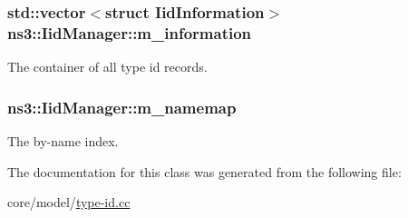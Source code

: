 \subsubsection[{\texorpdfstring{m\+\_\+information}{m_information}}]{\setlength{\rightskip}{0pt plus 5cm}std\+::vector$<$struct {\bf Iid\+Information}$>$ ns3\+::\+Iid\+Manager\+::m\+\_\+information\hspace{0.3cm}{\ttfamily [private]}}\hypertarget{classns3_1_1IidManager_a70a768fafd827135a13cd6e613e9c78e}{}\label{classns3_1_1IidManager_a70a768fafd827135a13cd6e613e9c78e}
The container of all type id records. 
\subsubsection[{\texorpdfstring{m\+\_\+namemap}{m_namemap}}]{ ns3\+::\+Iid\+Manager\+::m\+\_\+namemap\hspace{0.3cm}{\ttfamily [private]}}\hypertarget{classns3_1_1IidManager_aff98d5f56a6128126bd28261363472ca}{}\label{classns3_1_1IidManager_aff98d5f56a6128126bd28261363472ca}
The by-\/name index. 

The documentation for this class was generated from the following file\+:\begin{DoxyCompactItemize}
\item 
core/model/\hyperlink{type-id_8cc}{type-\/id.\+cc}\end{DoxyCompactItemize}
